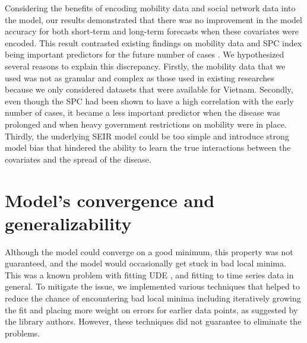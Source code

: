 Considering the benefits of encoding mobility data and social network data into the model, our results demonstrated that there was no improvement in the model accuracy for both short-term and long-term forecasts when these covariates were encoded.
This result contrasted existing findings on mobility data and \gls{SPC} index being important predictors for the future number of cases \cite{changMobilityNetworkModels2021,kuchlerGeographicSpreadCOVID192020,arikInterpretableSequenceLearning,liSubstantialUndocumentedInfection2020}.
We hypothesized several reasons to explain this discrepancy.
Firstly, the mobility data that we used was not as granular and complex as those used in existing researches because we only considered datasets that were available for Vietnam.
Secondly, even though the \gls{SPC} had been shown to have a high correlation with the early number of cases, it became a less important predictor when the disease was prolonged and when heavy government restrictions on mobility were in place.
Thirdly, the underlying \gls{SEIR} model could be too simple and introduce strong model bias that hindered the ability to learn the true interactions between the covariates and the spread of the disease.

\section{Model's convergence and generalizability}

Although the model could converge on a good minimum, this property was not guaranteed, and the model would occasionally get stuck in bad local minima.
This was a known problem with fitting \gls{UDE} \cite{rackauckasUniversalDifferentialEquations2020}, and fitting to time series data in general.
To mitigate the issue, we implemented various techniques that helped to reduce the chance of encountering bad local minima including iteratively growing the fit and placing more weight on errors for earlier data points, as suggested by the library authors.
However, these techniques did not guarantee to eliminate the problems.

